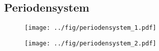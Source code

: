 \begin{appendices}
	\clearpage
	\chapter{Periodensystem}
	
	\begin{figure}\label{fig:persys}
		\centering
		\texttt{[image: ../fig/periodensystem\_1.pdf]}
	\end{figure}	

	\begin{figure}
		\centering
		\texttt{[image: ../fig/periodensystem\_2.pdf]}
	\end{figure}

\end{appendices}
